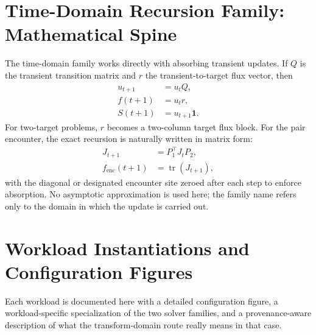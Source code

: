\documentclass[11pt]{article}
\newcommand{\TabDir}{../artifacts/tables}
\begin{document}
\section{Time-Domain Recursion Family: Mathematical Spine}
The time-domain family works directly with absorbing transient updates. If $Q$ is the transient transition matrix and $r$ the transient-to-target flux vector, then
\begin{align}
u_{t+1} &= u_t Q,\\
f(t+1) &= u_t r,\\
S(t+1) &= u_{t+1}\mathbf 1.
\end{align}
For two-target problems, $r$ becomes a two-column target flux block. For the pair encounter, the exact recursion is naturally written in matrix form:
\begin{align}
J_{t+1} &= P_1^{\top}J_tP_2,\\
f_{\mathrm{enc}}(t+1) &= \operatorname{tr}(J_{t+1}),
\end{align}
with the diagonal or designated encounter site zeroed after each step to enforce absorption. 
No asymptotic approximation is used here; the family name refers only to the domain in which the update is carried out.
\section{Workload Instantiations and Configuration Figures}
Each workload is documented here with a detailed configuration figure, a workload-specific specialization of the two solver families, and a provenance-aware description of what the transform-domain route really means in that case.
\begin{table}[H]
\centering\small
\resizebox{\linewidth}{!}{%

}
\caption{The six benchmark workloads kept in the unified comparison.}
\end{table}
\end{document}
